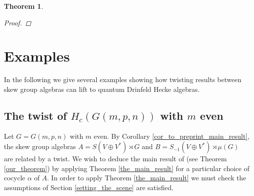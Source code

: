 \documentclass[10pt]{article}
\newcommand{\bb}{\medbreak}
\newcommand{\Cc }{\mathbb{C}}
\newcommand{\rt}{\xrightarrow{}}
\newtheorem{theorem}[lemma]{Theorem}
\theoremstyle{definition}
\begin{document}
\begin{theorem}
\begin{proof}
\end{proof}
\end{theorem}


\section{Examples}\label{examples_sec}
In the following we give several examples showing how twisting results between skew group algebras can lift to quantum Drinfeld Hecke algebras.

\subsection{The twist of \texorpdfstring{$H_c(G(m,p,n))$}{HcGmpn} with \texorpdfstring{$m$}{m} even}\label{preprint_main_result_example_sec}

Let $G=G(m,p,n)$ with $m$ even. By Corollary \ref{cor_to_preprint_main_result}, the skew group algebras $A=S(V\oplus V^*)\rtimes G$ and $B=S_{-1}(V\oplus V^*)\rtimes \mu(G)$ are related by a twist. We wish to deduce the main result of \cite{twistsrcas} (see Theorem \ref{our_theorem}) by applying Theorem \ref{the_main_result} for a particular choice of cocycle $\alpha$ of $A$. In order to apply Theorem \ref{the_main_result} we must check the assumptions of Section \ref{setting_the_scene} are satisfied.\bb
\end{document}
